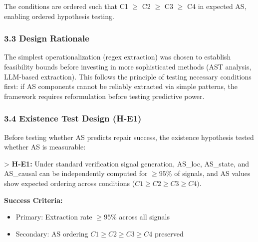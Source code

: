 The conditions are ordered such that C1 $\geq$ C2 $\geq$ C3 $\geq$ C4 in expected AS, enabling ordered hypothesis testing.

\subsubsection{3.3 Design Rationale}

The simplest operationalization (regex extraction) was chosen to establish feasibility bounds before investing in more sophisticated methods (AST analysis, LLM-based extraction). This follows the principle of testing necessary conditions first: if AS components cannot be reliably extracted via simple patterns, the framework requires reformulation before testing predictive power.

\subsubsection{3.4 Existence Test Design (H-E1)}

Before testing whether AS predicts repair success, the existence hypothesis tested whether AS is measurable:

> \textbf{H-E1:} Under standard verification signal generation, AS\_loc, AS\_state, and AS\_causal can be independently computed for $\geq 95$\% of signals, and AS values show expected ordering across conditions ($C1\geq C2\geq C3\geq C4)$.

\textbf{Success Criteria:}
\begin{itemize}
\item Primary: Extraction rate $\geq 95$\% across all signals
\item Secondary: AS ordering $C1\geq C2\geq C3\geq C4$ preserved
\end{itemize}


